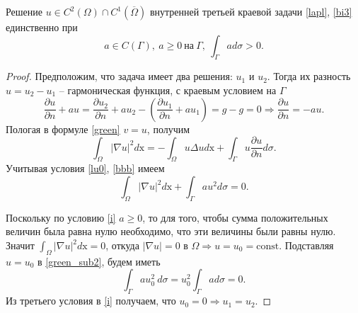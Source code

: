     \begin{theorem}
        Решение \( u \in C^2 (\Omega) \cap C^1(\overline{\Omega}) \) внутренней третьей краевой задачи \eqref{lapl}, \eqref{bi3} единственно при
        \begin{equation} \tag{$i$}
            a \in C(\Gamma), ~ a \geq 0 ~ \text{на} ~ \Gamma, ~ \int_\Gamma a d\sigma > 0. \label{i}
        \end{equation}
    \end{theorem}

    \begin{proof}
        Предположим, что задача имеет два решения: \(u_1\) и \(u_2\). Тогда их разность \( u = u_2 - u_1 \) -- гармоническая функция, с краевым условием на \( \Gamma \)
        \begin{equation}
            \frac{\partial u}{\partial n} + au = \frac{\partial u_2}{\partial n} + au_2 - \left( \frac{\partial u_1}{\partial n} + au_1 \right) = g - g = 0 \Rightarrow \frac{\partial u}{\partial n} = -au. \tag{$bbb$} \label{bbb}
        \end{equation}
        Пологая в формуле \eqref{green} \( v = u \), получим
        \begin{equation}
            \int_\Omega | \nabla u |^2 d\mathrm{x} = -\int_\Omega u \Delta u d\mathrm{x} + \int_\Gamma u \frac{\partial u}{\partial n} d\sigma.
        \end{equation}
        Учитывая условия \eqref{lu0}, \eqref{bbb} имеем
        \begin{equation}
            \int_\Omega | \nabla u |^2 d\mathrm{x} + \int_\Gamma a u^2 d\sigma = 0. \label{green_sub2}
        \end{equation}
        
        Поскольку по условию \eqref{i} \( a \geq 0 \), то для того, чтобы сумма положительных величин была равна нулю необходимо, что эти величины были равны нулю. Значит \( \int_\Omega | \nabla u |^2 d\mathrm{x} = 0 \), откуда \( |\nabla u| = 0 \) в \( \Omega \Rightarrow u = u_0 = \text{const} \). Подставляя \( u = u_0 \) в \eqref{green_sub2}, будем иметь
        \begin{equation}
            \int_\Gamma a u_0^2 ~ d\sigma = u_0^2  \int_\Gamma a d\sigma = 0.
        \end{equation} 
        Из третьего условия в \eqref{i} получаем, что \(u_0 = 0 \Rightarrow u_1 = u_2 \).
    \end{proof}



